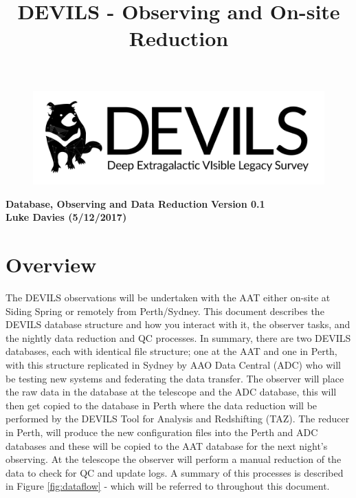 \documentclass[12pt]{article}
\begin{document}
\title{DEVILS - Observing and On-site Reduction}
\begin{center}

\begin{figure}
\begin{center}
\includegraphics[scale=0.8]{devils-logo_big.png}
\end{center}
\end{figure}

\Huge {\textcolor{PineGreen}{\textbf{Database, Observing and Data Reduction}}}
\Huge {\textcolor{PineGreen}{\textbf{ Version 0.1}}}\\
\Large \textbf{Luke Davies (5/12/2017)}\\
\end{center}
\normalsize


\section{Overview}

The DEVILS observations will be undertaken with the AAT either on-site at Siding Spring or remotely from Perth/Sydney. This document describes the DEVILS database structure and how you interact with it, the observer tasks, and the nightly data reduction and QC processes. In summary, there are two DEVILS databases, each with identical file structure; one at the AAT and one in Perth, with this structure replicated in Sydney by AAO Data Central (ADC) who will be testing new systems and federating the data transfer. The observer will place the raw data in the database at the telescope and the ADC database, this will then get copied to the database in Perth where the data reduction will be performed by the DEVILS Tool for Analysis and Redshifting (TAZ). The reducer in Perth, will produce the new configuration files into the Perth and ADC databases and these will be copied to the AAT database for the next night's observing. At the telescope the observer will perform a manual reduction of the data to check for QC and update logs. A summary of this processes is described in Figure \ref{fig:dataflow} - which will be referred to throughout this document. 
\end{document}
